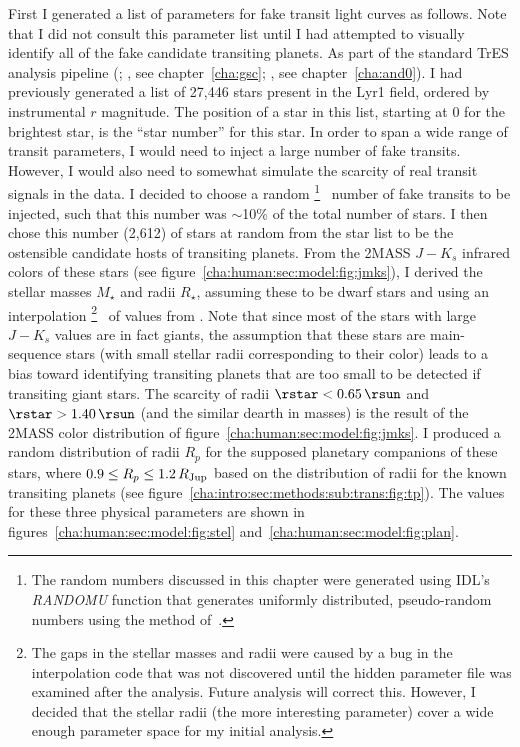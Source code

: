 First I generated a list of parameters for fake transit light curves as follows. 
Note that I did not consult this parameter list until I had attempted to visually identify all of the fake candidate transiting planets.
As part of the standard TrES analysis pipeline (\citealp[see, e.g.,][]{Dunham_Mandushev_Taylor:pasp:2004a}; \citealp{ODonovan_Charbonneau_Torres:apj:2006a}, see chapter~\ref{cha:gsc}; \citealp{ODonovan_Charbonneau_Alonso:apj:2007a}, see chapter~\ref{cha:and0}). 
I had previously generated a list of 27,446 stars present in the Lyr1 field, ordered by instrumental $r$ magnitude. 
The position of a star in this list, starting at 0 for the brightest star, is the ``star number'' for this star.
In order to span a wide range of transit parameters, I would need to inject a large number of fake transits.
However, I would also need to somewhat simulate the scarcity of real transit signals in the data.
I decided to choose a random%
\footnote{%
The random numbers discussed in this chapter were generated using IDL's \textit{RANDOMU} function that generates uniformly distributed, pseudo-random numbers using the method of~\citet{Park_Miller:ACM:1988a}.%
}%
\ number of fake transits to be injected, such that this number was $\sim$10\% of the total number of stars.
I then chose this number (2,612) of stars at random from the star list to be the ostensible candidate hosts of transiting planets. 
From the 2MASS \citep{Cutri_Skrutskie_van-Dyk:2003a} $J-K_{s}$ infrared colors of these stars (see figure~\ref{cha:human:sec:model:fig:jmks}), I derived the stellar masses $M_{\star}$ and radii $R_{\star}$, assuming these to be dwarf stars and using an interpolation%
\footnote{%
The gaps in the stellar masses and radii were caused by a bug in the interpolation code that was not discovered until the hidden parameter file was examined after the analysis.
Future analysis will correct this.
However, I decided that the stellar radii (the more interesting parameter) cover a wide enough parameter space for my initial analysis.%
}%
\ of values from \citet{Cox::2000a}. 
Note that since most of the stars with large $J-K_{s}$ values are in fact giants, the assumption that these stars are main-sequence stars (with small stellar radii corresponding to their color) leads to a bias toward identifying transiting planets that are too small to be detected if transiting giant stars. 
The scarcity of radii $\rstar<0.65\,\rsun$ and $\rstar>1.40\,\rsun$ (and the similar dearth in masses) is the result of the 2MASS color distribution of figure~\ref{cha:human:sec:model:fig:jmks}.
I produced a random distribution of radii $R_{p}$ for the supposed planetary companions of these stars, where $0.9\leq R_{p} \leq 1.2\,R_{\rm Jup}$ based on the distribution of radii for the known transiting planets (see figure~\ref{cha:intro:sec:methods:sub:trans:fig:tp}).
The values for these three physical parameters are shown in figures~\ref{cha:human:sec:model:fig:stel} and~\ref{cha:human:sec:model:fig:plan}. 

